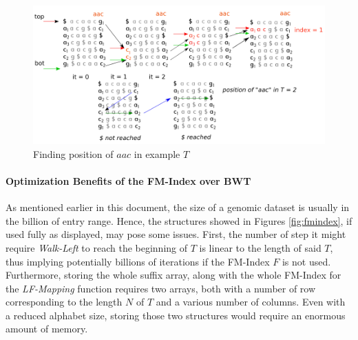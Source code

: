 \begin{figure}[H]
    \centering
    \includegraphics[scale=0.4]{Figures/MATCH.png}
    \caption{Finding position of $aac$ in example $T$ \cite{genomic}}
    \label{fig:match}
\end{figure}

\paragraph{Optimization Benefits of the FM-Index over BWT}

As mentioned earlier in this document, the size of a genomic dataset is usually in the billion of entry range. Hence, the structures showed in Figures \ref{fig:fmindex}, if used fully as displayed, may pose some issues. First, the number of step it might require \textsl{Walk-Left} to reach the beginning of $T$ is linear to the length of said $T$, thus implying potentially billions of iterations if the FM-Index $F$ is not used. Furthermore, storing the whole suffix array, along with the whole FM-Index for the \textsl{LF-Mapping} function requires two arrays, both with a number of row corresponding to the length $N$ of $T$ and a various number of columns. Even with a reduced alphabet size, storing those two structures would require an enormous amount of memory. \\

